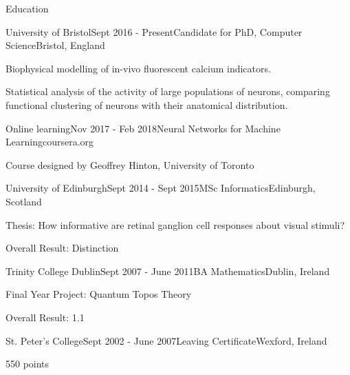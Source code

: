 \documentclass{resume} %
\begin{document}

\begin{rSection}{Education}
  \begin{rSubsection}{University of Bristol}{Sept 2016 - Present}{Candidate for PhD, Computer Science}{Bristol, England}
    \item Biophysical modelling of in-vivo fluorescent calcium indicators.
    \item Statistical analysis of the activity of large populations of neurons, comparing functional clustering of neurons with their anatomical distribution.
  \end{rSubsection}
  
  \begin{rSubsection}{Online learning}{Nov 2017 - Feb 2018}{Neural Networks for Machine Learning}{coursera.org}
    \item Course designed by Geoffrey Hinton, University of Toronto 
  \end{rSubsection}

  \begin{rSubsection}{University of Edinburgh}{Sept 2014 - Sept 2015}{MSc Informatics}{Edinburgh, Scotland}
    \item Thesis: How informative are retinal ganglion cell responses about visual stimuli?
    \item Overall Result: Distinction
  \end{rSubsection}

  \begin{rSubsection}{Trinity College Dublin}{Sept 2007 - June 2011}{BA Mathematics}{Dublin, Ireland}
    \item Final Year Project: Quantum Topos Theory 
    \item Overall Result: 1.1
  \end{rSubsection}

  \begin{rSubsection}{St. Peter's College}{Sept 2002 - June 2007}{Leaving Certificate}{Wexford, Ireland}
    \item 550 points   
  \end{rSubsection}
\end{rSection}

\end{document}
